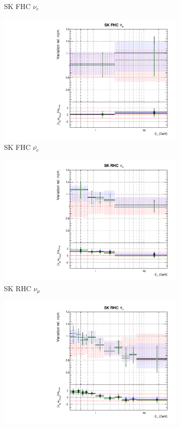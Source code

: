 \begin{figure}
\begin{subfigure}{0.24\textwidth}
  \caption{SK FHC $\nu_{e}$}
\end{subfigure}
\begin{subfigure}{0.24\textwidth}
  \centering
  \includegraphics[width=0.95\linewidth]{figs/polyasmvsflux_11}
  \caption{SK FHC $\bar{\nu_{e}}$}
\end{subfigure}
\begin{subfigure}{0.24\textwidth}
  \centering
  \includegraphics[width=0.95\linewidth]{figs/polyasmvsflux_12}
  \caption{SK RHC $\nu_{\mu}$}
\end{subfigure}
\begin{subfigure}{0.24\textwidth}
  \centering
  \includegraphics[width=0.95\linewidth]{figs/polyasmvsflux_13}

\end{subfigure}
\end{figure}
